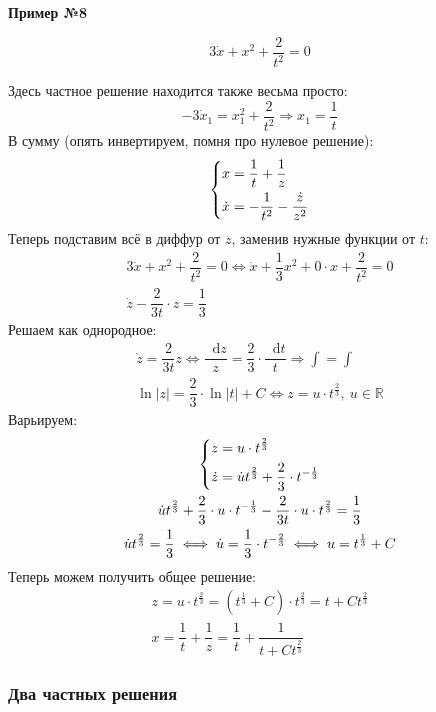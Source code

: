\documentclass[a4paper,12pt]{article}
\newcommand{\R}{\mathbb{R}}
\renewcommand*\d{\mathop{}\!\mathrm{d}}
\newcommand{\du}{\dot{u}}
\newcommand{\dx}{\dot{x}}
\newcommand{\dz}{\dot{z}}
\newcommand{\ds}{\displaystyle}
\begin{document}
\textbf{Пример №8}

\[3\dx + x^2 + \dfrac{2}{t^2} = 0\]

Здесь частное решение находится также весьма просто:
\[-3\dx_1 = x_1^2 + \dfrac{2}{t^2} \Longrightarrow x_1 = \dfrac{1}{t}\]
В сумму (опять инвертируем, помня про нулевое решение):
\[\left\{\begin{gathered}
x = \dfrac{1}{t} + \dfrac{1}{z}\hfill\\
\dx = -\dfrac{1}{t^2} - \dfrac{\dz}{z^2}\hfill
\end{gathered}\right.\]
Теперь подставим всё в диффур от $z$, заменив нужные функции от $t$:
\begin{gather*}
3\dx + x^2 + \dfrac{2}{t^2} = 0 \iff \dx + \dfrac{1}{3}x^2 + 0 \cdot x + \dfrac{2}{t^2} = 0\\
\dz - \dfrac{2}{3t}\cdot z = \dfrac{1}{3}
\end{gather*}
Решаем как однородное:
\begin{gather*}
\dz = \dfrac{2}{3t}z \iff \dfrac{\d z}{z} = \dfrac{2}{3} \cdot \dfrac{\d t}{t} \Longrightarrow\ds\int = \int\\
\ln|z| = \dfrac{2}{3} \cdot \ln|t| + C \iff z = u \cdot t^{\frac{2}{3}},\ u \in \R
\end{gather*}
Варьируем:
\begin{gather*}
\left\{\begin{gathered}
z = u \cdot t^{\frac{2}{3}}\hfill\\
\dz = \du t^{\frac{2}{3}} + \dfrac{2}{3} \cdot t^{-\frac{1}{3}} \hfill
\end{gathered}\right.\\
\du t^{\frac{2}{3}} + \dfrac{2}{3} \cdot u\cdot t^{-\frac{1}{3}} - \dfrac{2}{3t}\cdot u \cdot t^{\frac{2}{3}} = \dfrac{1}{3}\\
\du t^{\frac{2}{3}} = \dfrac{1}{3} \iff \du = \dfrac{1}{3} \cdot t^{-\frac{2}{3}} \iff u = t^{\frac{1}{3}} + C
\end{gather*}
Теперь можем получить общее решение:
\begin{gather*}
z = u \cdot t^{\frac{2}{3}} = \left(t^{\frac{1}{3}} + C\right) \cdot t^{\frac{2}{3}} = t + Ct^{\frac{2}{3}}\\
x = \dfrac{1}{t} + \dfrac{1}{z} = \dfrac{1}{t} + \dfrac{1}{t + Ct^{\frac{2}{3}}}
\end{gather*}

\subsubsection{Два частных решения}
\end{document}
